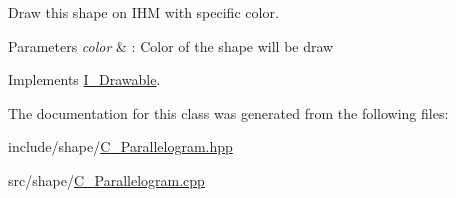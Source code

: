 Draw this shape on I\+HM with specific color. 


\begin{DoxyParams}{Parameters}
{\em color} & \+: Color of the shape will be draw \\
\hline
\end{DoxyParams}


Implements \hyperlink{classI__Drawable_a25f6474325614c451a91f019e5fe8010}{I\+\_\+\+Drawable}.



The documentation for this class was generated from the following files\+:\begin{DoxyCompactItemize}
\item 
include/shape/\hyperlink{C__Parallelogram_8hpp}{C\+\_\+\+Parallelogram.\+hpp}\item 
src/shape/\hyperlink{C__Parallelogram_8cpp}{C\+\_\+\+Parallelogram.\+cpp}\end{DoxyCompactItemize}
